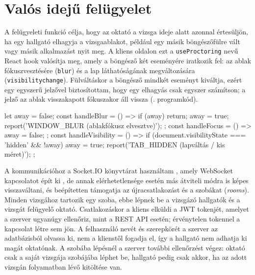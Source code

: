 \section{Valós idejű felügyelet}

A felügyeleti funkció célja, hogy az oktató a vizsga ideje alatt azonnal értesüljön, ha egy hallgató
elhagyja a vizsgaablakot, például egy másik böngészőfülre vált vagy másik alkalmazást nyit meg. A
kliens oldalon ezt a \texttt{useProctoring} nevű React hook valósítja meg, amely a böngésző két
eseményére iratkozik fel: az ablak fókuszvesztésére (\texttt{blur}) és a lap láthatóságának
megváltozására (\texttt{visibilitychange}). Fülváltáskor a böngésző mindkét eseményt kiváltja,
ezért egy egyszerű jelzővel biztosítottam, hogy egy elhagyás csak egyszer számítson; a jelző az
ablak visszakapott fókuszakor áll vissza (. programkód).

\begin{typescript}[caption={Az ablakelhagyás érzékelése (\texttt{useProctoring.ts}, részlet)},label=ts:proctoring]
let away = false;
const handleBlur = () => {
  if (away) return;
  away = true;
  report('WINDOW_BLUR (ablakfókusz elvesztve)');
};
const handleFocus = () => { away = false; };
const handleVisibility = () => {
  if (document.visibilityState === 'hidden' && !away) {
    away = true;
    report('TAB_HIDDEN (lapváltás / kis méret)');
  }
};
\end{typescript}

A kommunikációhoz a Socket.IO könyvtárat használtam \cite{socketio_docs}, amely WebSocket
kapcsolatot épít ki \cite{rfc6455}, de annak elérhetetlensége esetén más átviteli módra is képes
visszaváltani, és beépítetten támogatja az újracsatlakozást és a szobákat (\textit{rooms}).
Minden vizsgához tartozik egy szoba, ebbe lépnek be a vizsgázó hallgatók és a vizsgát felügyelő
oktató. Csatlakozáskor a kliens elküldi a JWT tokenjét, amelyet a szerver ugyanúgy ellenőriz, mint
a REST API esetén; érvénytelen tokennel a kapcsolat létre sem jön. A felhasználó nevét és
szerepkörét a szerver az adatbázisból olvassa ki, nem a klienstől fogadja el, így a hallgató nem
adhatja ki magát oktatónak. A szobába lépésnél a szerver további ellenőrzést végez: oktató csak a
saját vizsgája szobájába léphet be, hallgató pedig csak akkor, ha az adott vizsgán folyamatban lévő
kitöltése van.

